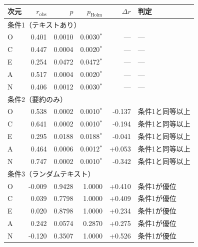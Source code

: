 \begingroup
\small
\begin{tabular}{lrrrrl}
\toprule
次元 & $r_{\mathrm{obs}}$ & $p$ & $p_{\mathrm{Holm}}$ & $\Delta r$ & 判定 \\
\midrule
\multicolumn{6}{l}{条件1（テキストあり）} \\
\quad O & 0.401 & 0.0010 & 0.0030$^{*}$ & --- & --- \\
\quad C & 0.447 & 0.0004 & 0.0020$^{*}$ & --- & --- \\
\quad E & 0.254 & 0.0472 & 0.0472$^{*}$ & --- & --- \\
\quad A & 0.517 & 0.0004 & 0.0020$^{*}$ & --- & --- \\
\quad N & 0.406 & 0.0012 & 0.0030$^{*}$ & --- & --- \\
\midrule
\multicolumn{6}{l}{条件2（要約のみ）} \\
\quad O & 0.538 & 0.0002 & 0.0010$^{*}$ & -0.137 & 条件1と同等以上 \\
\quad C & 0.641 & 0.0002 & 0.0010$^{*}$ & -0.194 & 条件1と同等以上 \\
\quad E & 0.295 & 0.0188 & 0.0188$^{*}$ & -0.041 & 条件1と同等以上 \\
\quad A & 0.464 & 0.0006 & 0.0012$^{*}$ & +0.053 & 条件1と同等以上 \\
\quad N & 0.747 & 0.0002 & 0.0010$^{*}$ & -0.342 & 条件1と同等以上 \\
\midrule
\multicolumn{6}{l}{条件3（ランダムテキスト）} \\
\quad O & -0.009 & 0.9428 & 1.0000 & +0.410 & 条件1が優位 \\
\quad C & 0.039 & 0.7798 & 1.0000 & +0.409 & 条件1が優位 \\
\quad E & 0.020 & 0.8798 & 1.0000 & +0.234 & 条件1が優位 \\
\quad A & 0.242 & 0.0574 & 0.2870 & +0.275 & 条件1が優位 \\
\quad N & -0.120 & 0.3507 & 1.0000 & +0.526 & 条件1が優位 \\
\bottomrule
\end{tabular}
\endgroup
